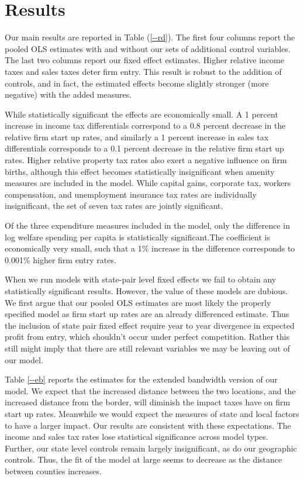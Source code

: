 \section{Results}

Our main results are reported in Table (\ref{--rd}). The first four columns report the pooled OLS estimates with and without our sets of additional control variables. The last two columns report our fixed effect estimates. Higher relative income taxes and sales taxes deter firm entry.  This result is robust to the addition of controls, and in fact, the estimated effects become slightly stronger (more negative) with the added measures.  

While statistically significant the effects are economically small.  A 1 percent increase in income tax differentials correspond to a 0.8 percent decrease in the relative firm start up rates, and similarly a 1 percent increase in sales tax differentials corresponds to a 0.1 percent decrease in the relative firm start up rates.  Higher relative property tax rates also exert a negative influence on firm births, although this effect becomes statistically insignificant when amenity measures are included in the model. While capital gains, corporate tax, workers compensation, and unemployment insurance tax rates are individually insignificant, the set of seven tax rates are jointly  significant. 

Of the three expenditure measures included in the model, only the difference in log welfare spending per capita is statistically significant.The coefficient is economically very small, such that a 1\% increase in the difference corresponds to 0.001\% higher firm entry rates.

When we run models with state-pair level fixed effects we fail to obtain any statistically significant results. However, the value of these models are dubious. We first argue that our pooled OLS estimates are most likely the properly specified model as firm start up rates are an already differenced estimate. Thus the inclusion of state pair fixed effect require year to year divergence in expected profit from entry, which shouldn’t occur under perfect competition. Rather this still might imply that there are still relevant variables we may be leaving out of our model.

Table \ref{--eb} reports the estimates for the extended bandwidth version of our model. We expect that the increased distance between the two locations, and the increased distance from the border, will diminish the impact taxes have on firm start up rates.  Meanwhile we would expect the  measures of state and local factors to have a larger impact.  Our results are consistent with these expectations. The income and sales tax rates lose statistical significance across model types. Further, our state level controls remain largely insignificant, as do our geographic controls. Thus, the fit of the model at large seems to decrease as the distance between counties increases. 

